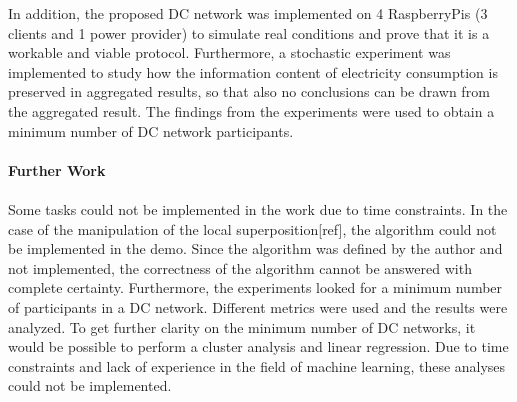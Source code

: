 In addition, the proposed DC network was implemented on 4 RaspberryPis (3 clients and 1 power provider) to simulate real conditions and prove that it is a workable and viable protocol. Furthermore, a stochastic experiment was implemented to study how the information content of electricity consumption is preserved in aggregated results, so that also no conclusions can be drawn from the aggregated result. The findings from the experiments were used to obtain a minimum number of DC network participants. \\
\\
\textbf{Further Work}
\\
\\
Some tasks could not be implemented in the work due to time constraints. In the case of the manipulation of the local superposition[ref], the algorithm could not be implemented in the demo. Since the algorithm was defined by the author and not implemented, the correctness of the algorithm cannot be answered with complete certainty. 
Furthermore, the experiments looked for a minimum number of participants in a DC network. Different metrics were used and the results were analyzed. To get further clarity on the minimum number of DC networks, it would be possible to perform a cluster analysis and linear regression. Due to time constraints and lack of experience in the field of machine learning, these analyses could not be implemented.





\cleardoublepage

